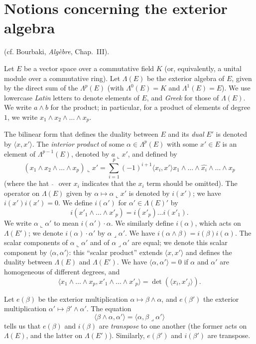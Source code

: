 \documentclass{article}
\newcommand{\llp}{\mathbin{\llcorner}}
\newcommand{\lrp}{\mathbin{\lrcorner}}
\newcommand{\oldpage}[1]{\marginpar{\footnotesize$\Big\vert$ \textit{p.~#1}}}
\begin{document}
\section{Notions concerning the exterior algebra}
\label{I.2}

{(cf. {\sc Bourbaki}, \emph{Alg\`{e}bre}, Chap.~III).}

Let $E$ be a vector space over a commutative field $K$ (or, equivalently, a unital module over a commutative ring).
Let $\Lambda(E)$ be the exterior algebra of $E$, given by the direct sum of the $\Lambda^p(E)$ (with $\Lambda^0(E)=K$ and $\Lambda^1(E)=E$).
We use lowercase \emph{Latin} letters to denote elements of $E$, and \emph{Greek} for those of $\Lambda(E)$.
We write $a\wedge b$ for the product;
in particular, for a product of elements of degree~$1$, we write $x_1\wedge x_2\wedge\ldots\wedge x_p$.

The bilinear form that defines the duality between $E$ and its \emph{dual} $E'$ is denoted by $\langle x,x'\rangle$.
The \emph{interior product} of some $\alpha\in\Lambda^p(E)$ with some $x'\in E$ is an element of $\Lambda^{p-1}(E)$, denoted by $a\llp x'$, and defined by
\[
  (x_1\wedge x_2\wedge\ldots\wedge x_p) \llp x'
  = \sum_{i=1}^p (-1)^{i+1} \langle x_i,x' \rangle x_1\wedge\ldots\wedge\widehat{x_i}\wedge\ldots\wedge x_p
\]
(where the hat $\;\widehat{\,}\;$ over $x_i$ indicates that the $x_i$ term should be omitted).
The operator on $\Lambda(E)$ given by $\alpha\mapsto\alpha\llp x'$ is denoted by $i(x')$;
we have $i(x')i(x')=0$.
We define $i(\alpha')$ for $\alpha'\in\Lambda(E)'$ by
\[
  i(x'_1\wedge\ldots\wedge x'_p)
  = i(x'_p)\ldots i(x'_1).
\]
We write
\oldpage{8}
$\alpha\llp\alpha'$ to mean $i(\alpha')\cdot\alpha$.
We similarly define $i(\alpha)$, which acts on $\Lambda(E')$;
we denote $i(\alpha)\cdot\alpha'$ by $\alpha\lrp\alpha'$.
We have $i(\alpha\wedge\beta)=i(\beta)i(\alpha)$.
The scalar components of $\alpha\llp\alpha'$ and of $\alpha\lrp\alpha'$ are equal;
we denote this scalar component by $\langle\alpha,\alpha'\rangle$: this ``scalar product'' extends $\langle x,x'\rangle$ and defines the duality between $\Lambda(E)$ and $\Lambda(E')$.
We have $\langle\alpha,\alpha'\rangle=0$ if $\alpha$ and $\alpha'$ are homogeneous of different degrees, and
\[
  \langle x_1\wedge\ldots\wedge x_p,x'_1\wedge\ldots\wedge x'_p\rangle = \det(\langle x_i,x'_j\rangle).
\]

Let $e(\beta)$ be the exterior multiplication $\alpha\mapsto\beta\wedge\alpha$, and $e(\beta')$ the exterior multiplication $\alpha'\mapsto\beta'\wedge\alpha'$.
The equation
\[
  \langle \beta\wedge\alpha, \alpha' \rangle
  = \langle \alpha, \beta\lrp\alpha' \rangle
\]
tells us that $e(\beta)$ and $i(\beta)$ are \emph{transpose} to one another (the former acts on $\Lambda(E)$, and the latter on $\Lambda(E')$).
Similarly, $e(\beta')$ and $i(\beta')$ are transpose.
\end{document}
